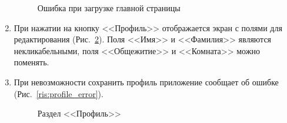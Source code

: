 \documentclass{../includes/TechDoc}
\begin{document}
\begin{enumerate}
\begin{figure}[ht]
\begin{center}
\begin{minipage}[ht]{0.3\linewidth}
                    \caption{Ошибка при загрузке главной страницы}
                    \label{ris:main_page_error}
                \end{minipage}
            \end{center}
        \end{figure}

        \item При нажатии на кнопку <<Профиль>> отображается экран с полями для редактирования (Рис.~\ref{ris:profile}).
        Поля <<Имя>> и <<Фамилия>> являются некликабельными, поля <<Общежитие>> и <<Комната>> можно поменять.
        \item При невозможности сохранить профиль приложение сообщает об ошибке (Рис.~\ref{ris:profile_error}).
        \begin{figure}[ht]
            \begin{center}
                \begin{minipage}[ht]{0.49\linewidth}
                    \caption{Раздел <<Профиль>>} %
                    \label{ris:profile} %
                \end{minipage}
                \hfill
                \begin{minipage}[ht]{0.49\linewidth}

\end{minipage}
\end{center}
\end{figure}
\end{enumerate}
\end{document}
